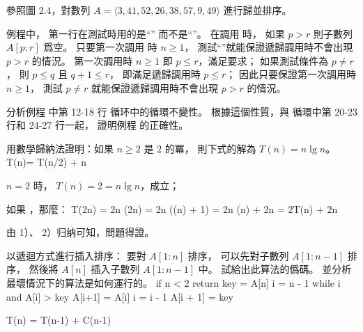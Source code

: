 \startsection[
  title={Designing algorithms},
]

\startEXERCISE
參照圖 2.4，對數列 $A=\langle 3,41,52,26,38,57,9,49\rangle$ 進行歸並排序。
\stopEXERCISE
\startANSWER
\externalfigure[e2_3_1-1]
\stopANSWER

\startEXERCISE
{} 例程中，
第一行在測試時用的是“” 而不是“”。
在調用  時，
如果 $p>r$ 則子數列 $A[p:r]$ 爲空。
只要第一次調用  時 $n\ge 1$，
測試“”就能保證遞歸調用時不會出現 $p>r$ 的情況。
\stopEXERCISE
\startANSWER
第一次調用時 $n\ge 1$ 即 $p\le r$，滿足要求；
如果測試條件為 $p\ne r$，
則 $p\le q$ 且 $q+1\le r$，
即滿足遞歸調用時 $p\le r$；
因此只要保證第一次調用時 $n\ge 1$，
測試 $p\ne r$ 就能保證遞歸調用時不會出現 $p>r$ 的情況。
\stopANSWER

\startEXERCISE
分析例程  中第 12-18 行  循环中的循環不變性。
根據這個性質，與  循環中第 20-23 行和 24-27 行一起，
證明例程  的正確性。
\stopEXERCISE
\startANSWER
{}
\stopANSWER

\startEXERCISE
用數學歸納法證明：如果 $n\ge 2$ 是 $2$ 的冪，
則下式的解為 $T(n)=n\lg n$。
\startformula
T(n)=\startmathcases
{} \NC {}\NR
{} T(n/2) + n \NC {} \NR
\stopmathcases
\stopformula
\stopEXERCISE

\startANSWER
\startigBase[n]
\item $n=2$ 時， $T(n)=2=n\lg n$，成立；
\item 如果 ，那麼：
\startsplitformula\startmathalignment
\NC T(2n) \NC = 2n \lg(2n) \NR
\NC       \NC = 2n (\lg(n) + 1) \NR
\NC	      \NC = 2n \lg(n) + 2n \NR
\NC	      \NC = 2T(n) + 2n \NR
\stopmathalignment\stopsplitformula
\item 由 1）、 2）归纳可知，問題得證。
\stopigBase
\stopANSWER

\startEXERCISE
以遞迴方式進行插入排序：
要對 $A[1:n]$ 排序，
可以先對子數列 $A[1:n-1]$ 排序，
然後將 $A[n]$ 插入子數列 $A[1:n-1]$ 中。
試給出此算法的僞碼。
並分析最壞情況下的算法是如何運行的。
\stopEXERCISE
\startANSWER
{}
\startCLRSCODE
if n < 2
	return
key = A[n]
i = n - 1
while i  and A[i] > key
	A[i+1] = A[i]
	i = i - 1
A[i + 1] = key
\stopCLRSCODE

\startformula
T(n) = \startmathcases
{} \NC {} \NR
\NC T(n-1) + C(n-1)	\NC {} \NR
\stopmathcases
\stopformula

